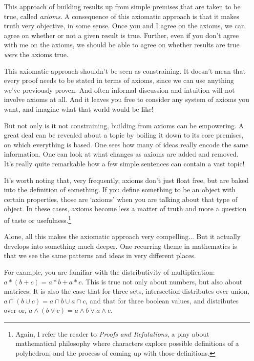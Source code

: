 \documentclass{report}
\begin{document}
This approach of building results up from simple premises that are taken to be true, called \emph{axioms}. A consequence of this axiomatic approach is that it makes truth very objective, in some sense. Once you and I agree on the axioms, we can agree on whether or not a given result is true.
Further, even if you don't agree with me on the axioms, we should be able to agree on whether results are true \emph{were} the axioms true.

This axiomatic approach shouldn't be seen as constraining. It doesn't mean that every proof needs to be stated in terms of axioms, since we can use anything we've previously proven. And often informal discussion and intuition will not involve axioms at all. And it leaves you free to consider any system of axioms you want, and imagine what that world would be like!

But not only is it not constraining, building from axioms can be empowering. A great deal can be revealed about a topic by boiling it down to its core premises, on which everything is based. One sees how many of ideas really encode the same information. One can look at what changes as axioms are added and removed. It's really quite remarkable how a few simple sentences can contain a vast topic!

It's worth noting that, very frequently, axioms don't just float free, but are baked into the definition of something. If you define something to be an object with certain properties, those are `axioms' when you are talking about that type of object. In these cases, axioms become less a matter of truth and more a question of taste or usefulness.\footnote{Again, I refer the reader to \emph{Proofs and Refutations}, a play about mathematical philosophy where characters explore possible definitions of a polyhedron, and the process of coming up with those definitions.}

Alone, all this makes the axiomatic approach very compelling... But it actually develops into something much deeper. One recurring theme in mathematics is that we see the same patterns and ideas in very different places.

For example, you are familiar with the distributivity of multiplication: $a*(b+c) = a*b+a*c$. This is true not only about numbers, but also about matrices. It is also the case that for three sets, intersection distributes over union, $a∩(b∪c) = a∩b ∪ a∩c$, and that for three boolean values, and distributes over or, $a∧(b∨c) = a∧b ∨ a∧c$.
\end{document}
